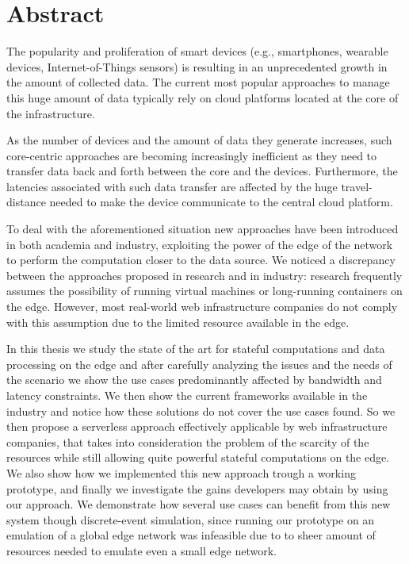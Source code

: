 \chapter*{Abstract}

The popularity and proliferation of smart devices (e.g., smartphones, wearable devices, Internet-of-Things sensors) is resulting in an unprecedented growth in the amount of collected data. The current most popular approaches to manage this huge amount of data typically rely on cloud platforms located at the core of the infrastructure.

As the number of devices and the amount of data they generate increases, such core-centric approaches are becoming increasingly inefficient as they need to transfer data back and forth between the core and the devices. Furthermore, the latencies associated with such data transfer are affected by the huge travel-distance needed to make the device communicate to the central cloud platform.

To deal with the aforementioned situation new approaches have been introduced in both academia and industry, exploiting the power of the edge of the network to perform the computation closer to the data source. We noticed a discrepancy between the approaches proposed in research and in industry: research frequently assumes the possibility of running virtual machines or long-running containers on the edge. However, most real-world web infrastructure companies do not comply with this assumption due to the limited resource available in the edge.

In this thesis we study the state of the art for stateful computations and data processing on the edge and after carefully analyzing the issues and the needs of the scenario we show the use cases predominantly affected by bandwidth and latency constraints. We then show the current frameworks available in the industry and notice how these solutions do not cover the use cases found. So we then propose a serverless approach effectively applicable by web infrastructure companies, that takes into consideration the problem of the scarcity of the resources while still allowing quite powerful stateful computations on the edge. We also show how we implemented this new approach trough a working prototype, and finally we investigate the gains developers may obtain by using our approach. We demonstrate how several use cases can benefit from this new system though discrete-event simulation, since running our prototype on an emulation of a global edge network was infeasible due to to sheer amount of resources needed to emulate even a small edge network.

